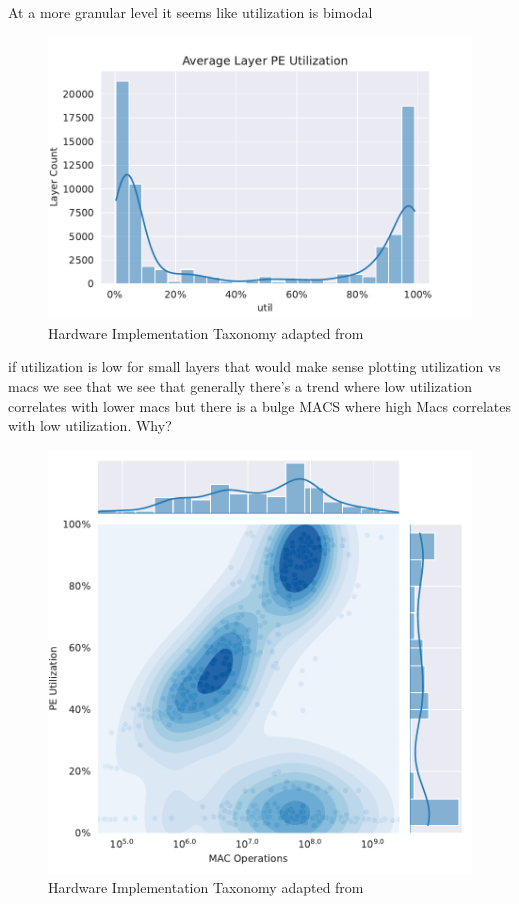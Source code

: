 At a more granular level it seems like utilization is bimodal

\begin{figure}[ht]
    \centering
    \includegraphics[scale=0.58]{Plots/utilization/layers.pdf}
    \caption{Hardware Implementation Taxonomy adapted from \cite{maestro}}
    \label{fig:hw_taxonomy}
\end{figure}

if utilization is low for small layers that would make sense
plotting utilization vs macs we see that we see that generally there's a trend where low
utilization correlates with lower macs
but there is a bulge MACS where high Macs correlates
with low utilization. Why? 

\begin{figure}[ht]
    \centering
    \includegraphics[scale=0.58]{Plots/utilization/util_vs_macs.pdf}
    \caption{Hardware Implementation Taxonomy adapted from \cite{maestro}}
    \label{fig:hw_taxonomy}
\end{figure}


